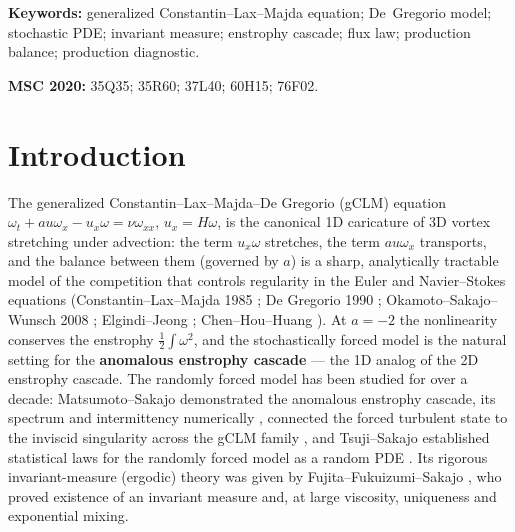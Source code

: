 \documentclass[11pt]{article}
\theoremstyle{remark}
\theoremstyle{plain}
\begin{document}
\medskip
\noindent\textbf{Keywords:} generalized Constantin--Lax--Majda equation; De~Gregorio
model; stochastic PDE; invariant measure; enstrophy cascade; flux law;
production balance; production diagnostic.

\noindent\textbf{MSC 2020:} 35Q35; 35R60; 37L40; 60H15; 76F02.

\section{Introduction}

The generalized Constantin--Lax--Majda--De Gregorio (gCLM) equation
$\omega_t + a u \omega_x - u_x \omega = \nu \omega_{xx}$, $u_x = H\omega$, is the canonical 1D caricature of
3D vortex stretching under advection: the term $u_x\omega$ stretches, the term $au\omega_x$
transports, and the balance between them (governed by $a$) is a sharp,
analytically tractable model of the competition that controls regularity in the
Euler and Navier--Stokes equations (Constantin--Lax--Majda 1985 \cite{CLM1985}; De Gregorio
1990 \cite{DeGregorio1990}; Okamoto--Sakajo--Wunsch 2008 \cite{OSW2008}; Elgindi--Jeong
\cite{ElgindiJeong2020}; Chen--Hou--Huang \cite{CHH2021}). At $a = -2$ the
nonlinearity conserves the enstrophy $\tfrac12\int\omega^2$, and the stochastically forced model
is the natural setting for the \textbf{anomalous enstrophy cascade} --- the 1D analog of
the 2D enstrophy cascade. The randomly forced model has been studied for over a decade: Matsumoto--Sakajo demonstrated the anomalous enstrophy cascade,
its spectrum and intermittency numerically \cite{MS2016}, connected the forced
turbulent state to the inviscid singularity across the gCLM family \cite{MS2017}, and
Tsuji--Sakajo established statistical laws for the randomly forced model as a random
PDE \cite{TS2023}. Its rigorous invariant-measure (ergodic) theory was given
by Fujita--Fukuizumi--Sakajo \cite{FFS2026}, who proved existence of an invariant measure
and, at large viscosity, uniqueness and exponential mixing.
\end{document}

